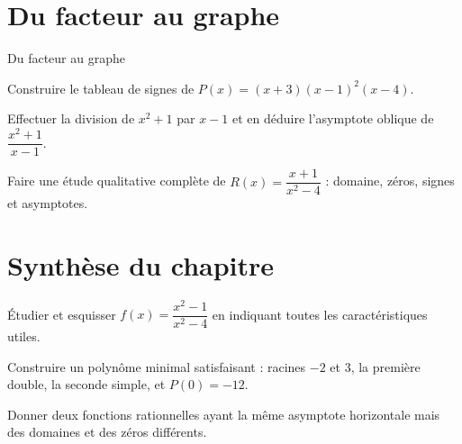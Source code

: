 \section{Du facteur au graphe}
\label{workbook:section:05.04}
\begin{exerciseblock}{Du facteur au graphe}
\item Construire le tableau de signes de $P(x)=(x+3)(x-1)^2(x-4)$.
\item Effectuer la division de $x^2+1$ par $x-1$ et en déduire l'asymptote oblique de $\dfrac{x^2+1}{x-1}$.
\item Faire une étude qualitative complète de $R(x)=\dfrac{x+1}{x^2-4}$ : domaine, zéros, signes et asymptotes.
\end{exerciseblock}
\section*{Synthèse du chapitre}
\begin{synthesisbox}
\item Étudier et esquisser $f(x)=\dfrac{x^2-1}{x^2-4}$ en indiquant toutes les caractéristiques utiles.
\item Construire un polynôme minimal satisfaisant : racines $-2$ et $3$, la première double, la seconde simple, et $P(0)=-12$.
\item Donner deux fonctions rationnelles ayant la même asymptote horizontale mais des domaines et des zéros différents.
\end{synthesisbox}
